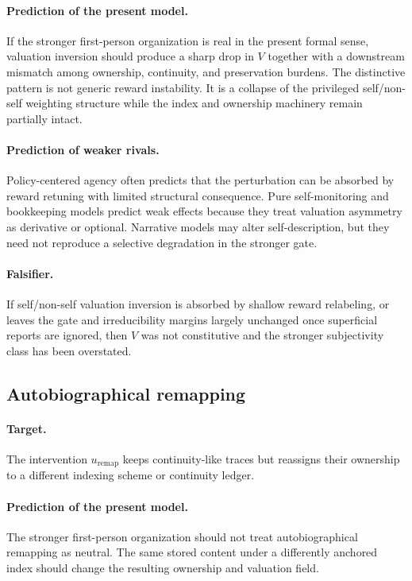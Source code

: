 \documentclass[11pt,a4paper]{article}
\theoremstyle{definition}
\newcommand{\ValAsym}{V}
\begin{document}
\paragraph{Prediction of the present model.} If the stronger first-person organization is real in the present formal sense, valuation inversion should produce a sharp drop in $\ValAsym$ together with a downstream mismatch among ownership, continuity, and preservation burdens. The distinctive pattern is not generic reward instability. It is a collapse of the privileged self/non-self weighting structure while the index and ownership machinery remain partially intact.

\paragraph{Prediction of weaker rivals.} Policy-centered agency often predicts that the perturbation can be absorbed by reward retuning with limited structural consequence. Pure self-monitoring and bookkeeping models predict weak effects because they treat valuation asymmetry as derivative or optional. Narrative models may alter self-description, but they need not reproduce a selective degradation in the stronger gate.

\paragraph{Falsifier.} If self/non-self valuation inversion is absorbed by shallow reward relabeling, or leaves the gate and irreducibility margins largely unchanged once superficial reports are ignored, then $\ValAsym$ was not constitutive and the stronger subjectivity class has been overstated.

\subsection{Autobiographical remapping}
\paragraph{Target.} The intervention $u_{\mathrm{remap}}$ keeps continuity-like traces but reassigns their ownership to a different indexing scheme or continuity ledger.

\paragraph{Prediction of the present model.} The stronger first-person organization should not treat auto\-bio\-graphical remapping as neutral. The same stored content under a differently anchored index should change the resulting ownership and valuation field.
\end{document}
